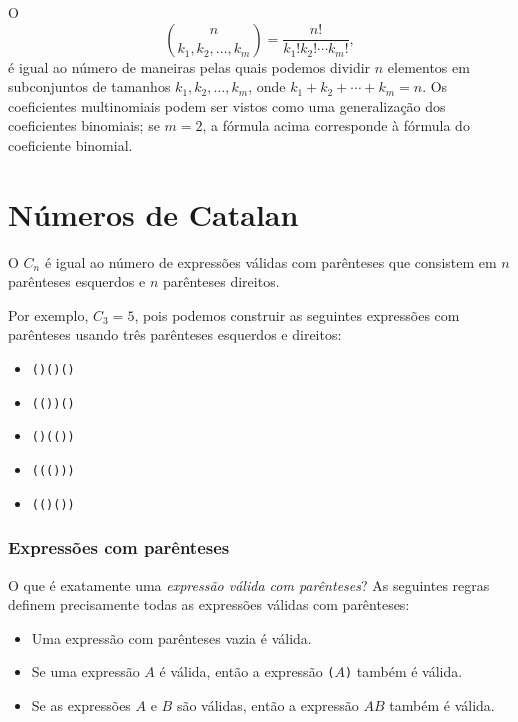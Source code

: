 
O 
\[ {n \choose k_1,k_2,\ldots,k_m} = \frac{n!}{k_1! k_2! \cdots k_m!}, \]
é igual ao número de maneiras
pelas quais podemos dividir $n$ elementos em subconjuntos
de tamanhos $k_1,k_2,\ldots,k_m$,
onde $k_1+k_2+\cdots+k_m=n$.
Os coeficientes multinomiais podem ser vistos como uma
generalização dos coeficientes binomiais;
se $m=2$, a fórmula acima
corresponde à fórmula do coeficiente binomial.

\section{Números de Catalan}


O 
$C_n$ é igual ao
número de expressões válidas com parênteses que consistem em
$n$ parênteses esquerdos e $n$ parênteses direitos.

Por exemplo, $C_3=5$, pois
podemos construir as seguintes expressões com parênteses usando três
parênteses esquerdos e direitos:

\begin{itemize}[noitemsep]
\item \texttt{()()()}
\item \texttt{(())()}
\item \texttt{()(())}
\item \texttt{((()))}
\item \texttt{(()())}
\end{itemize}

\subsubsection{Expressões com parênteses}


O que é exatamente uma \emph{expressão válida com parênteses}?
As seguintes regras definem precisamente todas
as expressões válidas com parênteses:

\begin{itemize}
\item Uma expressão com parênteses vazia é válida.
\item Se uma expressão $A$ é válida,
então a expressão
\texttt{(}$A$\texttt{)} também é válida.
\item Se as expressões $A$ e $B$ são válidas,
então a expressão $AB$ também é válida.
\end{itemize}


